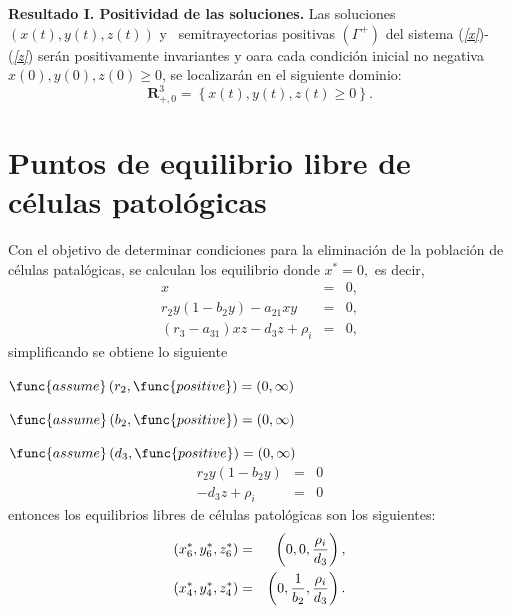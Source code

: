 \documentclass[letterpaper,11pt]{article}
\begin{document}
\noindent \textbf{Resultado I. Positividad de las soluciones. }Las
soluciones $\left( x\left( t\right) ,y\left( t\right) ,z\left( t\right)
\right) $ y \ semitrayectorias positivas $\left( \Gamma ^{+}\right) $ del
sistema (\textit{\ref{x}})-(\textit{\ref{z}}) ser\'{a}n positivamente
invariantes y oara cada condici\'{o}n inicial no negativa $x\left( 0\right)
,y\left( 0\right) ,z\left( 0\right) \geq 0$, se localizar\'{a}n en el
siguiente dominio:\ 
\begin{equation*}
\mathbf{R}_{+,0}^{3}=\left\{ x\left( t\right) ,y\left( t\right) ,z\left(
t\right) \geq 0\right\} .
\end{equation*}

\section{Puntos de equilibrio libre de c\'{e}lulas patol\'{o}gicas}

Con el objetivo de determinar condiciones para la eliminaci\'{o}n de la
poblaci\'{o}n de c\'{e}lulas patal\'{o}gicas, se calculan los equilibrio
donde $x^{\ast }=0,$ es decir,%
\begin{eqnarray*}
x &=&0, \\
r_{2}y\left( 1-b_{2}y\right) -a_{21}xy &=&0, \\
\left( r_{3}-a_{31}\right) xz-d_{3}z+\rho _{i} &=&0,
\end{eqnarray*}%
simplificando se obtiene lo siguiente\ 

$\func{assume}\left( r_{2},\func{positive}\right) =\allowbreak \left(
0,\infty \right) $

$\func{assume}\left( b_{2},\func{positive}\right) =\allowbreak \left(
0,\infty \right) $

$\func{assume}\left( d_{3},\func{positive}\right) =\allowbreak \left(
0,\infty \right) $%
\begin{eqnarray*}
r_{2}y\left( 1-b_{2}y\right) &=&0 \\
-d_{3}z+\rho _{i} &=&0
\end{eqnarray*}%
entonces los equilibrios libres de c\'{e}lulas patol\'{o}gicas son los
siguientes:%
\begin{eqnarray*}
\left( x_{6}^{\ast },y_{6}^{\ast },z_{6}^{\ast }\right) &=&\left( 0,0,\frac{%
\rho _{i}}{d_{3}}\right) , \\
\left( x_{4}^{\ast },y_{4}^{\ast },z_{4}^{\ast }\right) &=&\left( 0,\frac{1}{%
b_{2}},\frac{\rho _{i}}{d_{3}}\right) .
\end{eqnarray*}
\end{document}
